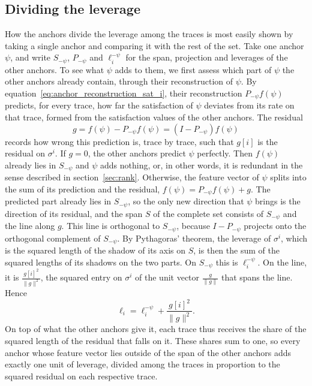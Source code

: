 \documentclass[titlepage,a4paper,11pt]{report}
\begin{document}
    \subsection{Dividing the leverage}\label{sec:dividing_the_leverage}
    How the anchors divide the leverage among the traces is most easily shown by taking a single anchor and comparing it with the rest of the set. Take one anchor $\psi$, and write $S_{-\psi}$, $P_{-\psi}$ and $\ell_i^{-\psi}$ for the span, projection and leverages of the other anchors. To see what $\psi$ adds to them, we first assess which part of $\psi$ the other anchors already contain, through their reconstruction of $\psi$. By equation~\eqref{eq:anchor_reconstruction_sat_i}, their reconstruction $P_{-\psi}f(\psi)$ predicts, for every trace, how far the satisfaction of $\psi$ deviates from its rate on that trace, formed from the satisfaction values of the other anchors. The residual
    \begin{equation}\label{eq:anchor_residual}
        g=f(\psi)-P_{-\psi}f(\psi)=(I-P_{-\psi})f(\psi)
    \end{equation}
    records how wrong this prediction is, trace by trace, such that $g[i]$ is the residual on $\sigma^i$. If $g=0$, the other anchors predict $\psi$ perfectly. Then $f(\psi)$ already lies in $S_{-\psi}$ and $\psi$ adds nothing, or, in other words, it is redundant in the sense described in section~\ref{sec:rank}. Otherwise, the feature vector of $\psi$ splits into the sum of its prediction and the residual, $f(\psi)=P_{-\psi}f(\psi)+g$. The predicted part already lies in $S_{-\psi}$, so the only new direction that $\psi$ brings is the direction of its residual, and the span $S$ of the complete set consists of $S_{-\psi}$ and the line along $g$. This line is orthogonal to $S_{-\psi}$, because $I-P_{-\psi}$ projects onto the orthogonal complement of $S_{-\psi}$. By Pythagoras' theorem, the leverage of $\sigma^i$, which is the squared length of the shadow of its axis on $S$, is then the sum of the squared lengths of its shadows on the two parts. On $S_{-\psi}$ this is $\ell_i^{-\psi}$. On the line, it is $\frac{g[i]^2}{\lVert g\rVert^2}$, the squared entry on $\sigma^i$ of the unit vector $\frac{g}{\lVert g\rVert}$ that spans the line. Hence
    \begin{equation}\label{eq:leverage_update}
        \ell_i=\ell_i^{-\psi}+\frac{g[i]^2}{\lVert g\rVert^2}.
    \end{equation}
    On top of what the other anchors give it, each trace thus receives the share of the squared length of the residual that falls on it. These shares sum to one, so every anchor whose feature vector lies outside of the span of the other anchors adds exactly one unit of leverage, divided among the traces in proportion to the squared residual on each respective trace.
\end{document}
